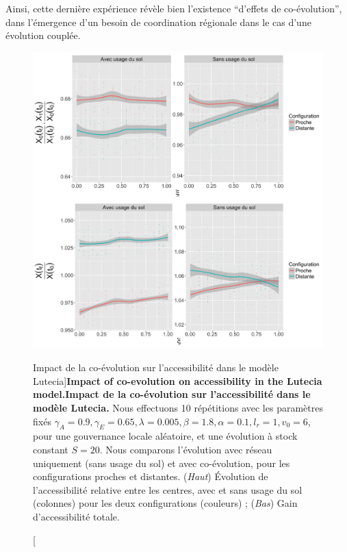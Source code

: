 Ainsi, cette dernière expérience révèle bien l'existence ``d'effets de co-évolution'', dans l'émergence d'un besoin de coordination régionale dans le cas d'une évolution couplée.



\begin{figure}
	\includegraphics[width=\linewidth]{Figures/Final/7-3-3-fig-lutecia-coevol.jpg}
	\caption[Impact of co-evolution on accessibility in the Lutecia model.][Impact de la co-évolution sur l'accessibilité dans le modèle Lutecia]{\textbf{Impact of co-evolution on accessibility in the Lutecia model.}\label{fig:lutecia:coevol}}{\textbf{Impact de la co-évolution sur l'accessibilité dans le modèle Lutecia.} Nous effectuons 10 répétitions avec les paramètres fixés $\gamma_A = 0.9, \gamma_E = 0.65, \lambda = 0.005, \beta = 1.8, \alpha = 0.1, l_r = 1, v_0 = 6$, pour une gouvernance locale aléatoire, et une évolution à stock constant $S=20$. Nous comparons l'évolution avec réseau uniquement (sans usage du sol) et avec co-évolution, pour les configurations proches et distantes. (\textit{Haut}) Évolution de l'accessibilité relative entre les centres, avec et sans usage du sol (colonnes) pour les deux configurations (couleurs) ; (\textit{Bas}) Gain d'accessibilité totale.\label{fig:lutecia:coevol}}
\end{figure}





